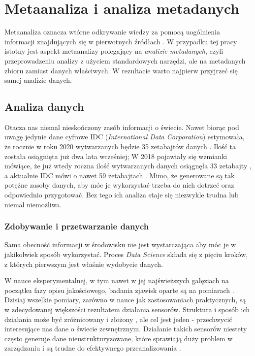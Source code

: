 \chapter{Metaanaliza i analiza metadanych}

Metaanaliza oznacza wtórne odkrywanie wiedzy za pomocą uogólnienia informacji znajdujących się w pierwotnych źródłach \cite{higgins2019cochrane}.
W przypadku tej pracy istotny jest aspekt metaanalizy polegający na \textit{analizie metadanych}, czyli przeprowadzeniu analizy z użyciem standardowych narzędzi, ale na metadanych zbioru zamiast danych właściwych.
W rezultacie warto najpierw przyjrzeć się samej analizie danych.

\section{Analiza danych}

Otacza nas niemal nieskończony zasób informacji o świecie.
Nawet biorąc pod uwagę jedynie dane cyfrowe IDC (\textit{International Data Corporation}) estymowała, że rocznie w roku 2020 wytwarzanych będzie 35 zetabajtów danych \cite{tien2013big}.
Ilość ta została osiągnięta już dwa lata wcześniej; W 2018 pojawiały się wzmianki mówiące, że już wtedy roczna ilość wytwarzanych danych osiągnęła 33 zetabajty \cite{Patrizio:2018}, a aktualnie IDC mówi o nawet 59 zetabajtach \cite{IDC:2020}.
Mimo, że generowane są tak potężne zasoby danych, aby móc je wykorzystać trzeba do nich dotrzeć oraz odpowiednio przygotować.
Bez tego ich analiza staje się niezwykle trudna lub niemal niemożliwa.

	\subsection{Zdobywanie i przetwarzanie danych}
	Sama obecność informacji w środowisku nie jest wystarczająca aby móc je w jakikolwiek sposób wykorzystać.
	Proces \textit{Data Science} składa się z pięciu kroków, z których pierwszym jest właśnie wydobycie danych.

	W nauce eksperymentalnej, w tym nawet w jej najświeższych gałęziach na początku fazy opisu jakościowego, badania zjawisk oparte są na pomiarach \cite{brandt1998data}.
	Dzisiaj wszelkie pomiary, zarówno w nauce jak zastosowaniach praktycznych, są w zdecydowanej większości rezultatem działania sensorów.
	Struktura i sposób ich działania może być zróżnicowany i złożony \cite{deshpande2004model,boyer2009scada}, ale cel jest jeden - przechwycić interesujące nas dane o świecie zewnętrznym.
	Działanie takich sensorów niestety często generuje dane nieustrukturyzowane, które sprawiają duży problem w zarządzaniu i są trudne do efektywnego przeanalizowania \cite{blumberg2003problem}.

